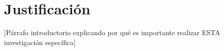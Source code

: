 %
%
%
%
%
%
%

\chapter{Justificación}
\label{cap:justificacion}


[Párrafo introductorio explicando por qué es importante realizar ESTA investigación específica]

